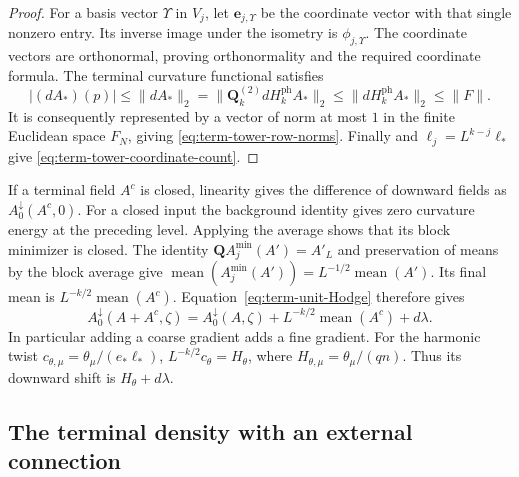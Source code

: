 \documentclass[11pt,letterpaper,reqno]{amsart}
\begin{document}
\begin{proof}
For a basis vector $\Upsilon$ in $V_j$, let
$\mathbf e_{j,\Upsilon}$ be the coordinate vector
with that single nonzero entry.
Its inverse image under the isometry is
$\phi_{j,\Upsilon}$.
The coordinate vectors are orthonormal, proving
orthonormality and the required coordinate formula.
The terminal curvature functional satisfies
\[
 |(dA_*)(p)|
 \le\|dA_*\|_2
   =\|\mathbf Q_k^{(2)}dH_k^{\mathrm{ph}}A_*\|_2
 \le\|dH_k^{\mathrm{ph}}A_*\|_2\le\|F\|.
\]
It is consequently represented by a vector of norm
at most $1$ in the finite Euclidean space $F_N$,
giving \eqref{eq:term-tower-row-norms}.
Finally \cite[(19)]{MaxwellBlock} and
$\ell_j=L^{k-j}\ell_*$ give
\eqref{eq:term-tower-coordinate-count}.
\end{proof}


If a terminal field $A^c$ is closed, linearity gives
the difference of downward fields as
$A_0^\downarrow(A^c,0)$.
For a closed input the background identity
\cite[(30)]{MaxwellBlock} gives zero
curvature energy at the preceding level. Applying
the average shows that its block minimizer is closed.
The identity $\mathbf QA_j^{\min}(A')=A'_L$ and
preservation of means by the block average give
$\operatorname{mean}(A_j^{\min}(A'))=
L^{-1/2}\operatorname{mean}(A')$.
Its final mean is $L^{-k/2}\operatorname{mean}(A^c)$.
Equation~\eqref{eq:term-unit-Hodge} therefore gives
\begin{equation}\label{eq:term-closed-terminal-shift}
 A_0^\downarrow(A+A^c,\zeta)
    =A_0^\downarrow(A,\zeta)
        +L^{-k/2}\operatorname{mean}(A^c)+d\lambda .
\end{equation}
In particular adding a coarse gradient adds a fine
gradient. For the harmonic twist
$c_{\theta,\mu}=\theta_\mu/(e_*\ell_*)$,
$L^{-k/2}c_\theta=H_\theta$, where
$H_{\theta,\mu}=\theta_\mu/(qn)$.
Thus its downward shift is $H_\theta+d\lambda$.

\subsection{The terminal density with an external connection}
\label{subsec:term-density}
\end{document}
